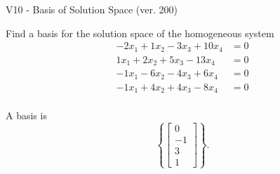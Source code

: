 \begin{exercise}
  \begin{exerciseTitle}V10 - Basis of Solution Space (ver. 200)\end{exerciseTitle}
  \begin{exerciseStatement}
    Find a basis for the solution space of the homogeneous system 
\begin{align*}
 -2 x_ 1 + 1 x_ 2 -3 x_ 3 + 10 x_ 4 &= 0  \\ 
  1 x_ 1 + 2 x_ 2 + 5 x_ 3 -13 x_ 4 &= 0  \\ 
  -1 x_ 1 -6 x_ 2 -4 x_ 3 + 6 x_ 4 &= 0  \\ 
  -1 x_ 1 + 4 x_ 2 + 4 x_ 3 -8 x_ 4 &= 0  \\ 
 \end{align*}


 
  \end{exerciseStatement}

  \begin{exerciseAnswer}
   A basis is   
\[\left\{\left[\begin{array}{c}
0 \\
-1 \\
3 \\
1
\end{array}\right]\right\}.\]

  


  \end{exerciseAnswer}
\end{exercise}